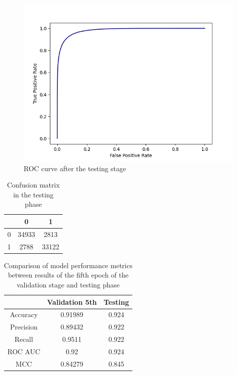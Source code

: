 \documentclass[12pt]{article}
\begin{document}
	\begin{figure}[h!]
		\centering
		\includegraphics[scale=0.7]{testing_0_3068.png}

		\caption{ ROC curve after the testing stage}
		\label{figure:SLP003testing}
	\end{figure}

	\begin{table}[h!]
		\caption{Confusion matrix in the testing phase}
		\vspace{0.2cm}
		\centering
		\begin{tabular}{ | c | c c | }
			\hline 
			& 0 & 1 \\
			\hline  
			0 & 34933 & 2813 \\
			1 & 2788 & 33122 \\
			\hline    
		\end{tabular}
		\label{table:SLP003confusionMatrixTesting}
	\end{table}

	\begin{table}[h!]
		\caption{Comparison of model performance metrics between 
		results of the fifth epoch of the validation stage and 
		testing phase}
		\vspace{0.2cm}
		\centering
		\begin{tabular}{ | c c c | }
			\hline 
			& Validation 5th & Testing \\
			\hline
			Accuracy & 0.91989 & 0.924 \\
			Precision & 0.89432 & 0.922 \\
			Recall & 0.9511 & 0.922 \\
			ROC AUC & 0.92 & 0.924 \\
			MCC & 0.84279 & 0.845 \\
			\hline 
		\end{tabular}
		\label{table:SLP003metricsTesting}
	\end{table}
\end{document}
